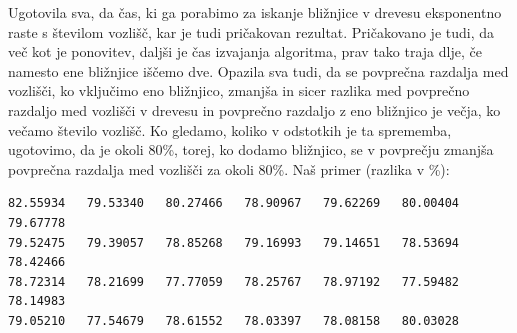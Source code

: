 \documentclass[a4paper,10pt]{article}
\begin{document}
Ugotovila sva, da čas, ki ga porabimo za iskanje bližnjice v drevesu eksponentno raste s številom vozlišč, kar je tudi pričakovan rezultat. Pričakovano je tudi, da več kot je ponovitev, daljši je čas izvajanja algoritma, prav tako traja dlje, če namesto ene bližnjice iščemo dve.
\newline
Opazila sva tudi, da se povprečna razdalja med vozlišči, ko vključimo eno bližnjico, zmanjša in sicer razlika med povprečno razdaljo med vozlišči v drevesu in povprečno razdaljo z eno bližnjico je večja, ko večamo število vozlišč. 
\newline
Ko gledamo, koliko v odstotkih je ta sprememba, ugotovimo, da je okoli 80\%, torej, ko dodamo bližnjico, se v povprečju zmanjša povprečna razdalja med vozlišči za okoli 80\%.
\newline
Naš primer (razlika v \%):
\begin{verbatim}
82.55934   79.53340   80.27466   78.90967   79.62269   80.00404   79.67778
79.52475   79.39057   78.85268   79.16993   79.14651   78.53694   78.42466
78.72314   78.21699   77.77059   78.25767   78.97192   77.59482   78.14983
79.05210   77.54679   78.61552   78.03397   78.08158   80.03028
\end{verbatim}
\end{document}
